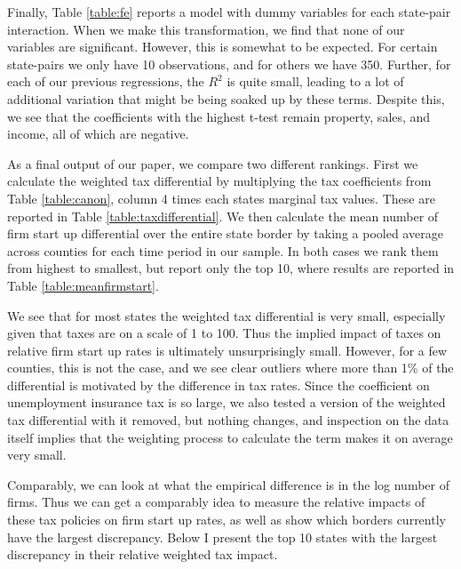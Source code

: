 Finally, Table \ref{table:fe} reports a model with dummy variables for each state-pair interaction. When we make this transformation, we find that none of our variables are significant. However, this is somewhat to be expected. For certain state-pairs we only have 10 observations, and for others we have 350. Further, for each of our previous regressions, the $R^{2}$ is quite small, leading to a lot of additional variation that might be being soaked up by these terms. Despite this, we see that the coefficients with the highest t-test remain property, sales, and income, all of which are negative.

As a final output of our paper, we compare two different rankings. First we calculate the weighted tax differential by multiplying the tax coefficients from Table \ref{table:canon}, column 4 times each states marginal tax values. These are reported in Table \ref{table:taxdifferential}. We then calculate the mean number of firm start up differential over the entire state border by taking a pooled average across counties for each time period in our sample. In both cases we rank them from highest to smallest, but report only the top 10, where results are reported in Table \ref{table:meanfirmstart}.

We see that for most states the weighted tax differential is very small, especially given that taxes are on a scale of 1 to 100. Thus the implied impact of taxes on relative firm start up rates is ultimately unsurprisingly small. However, for a few counties, this is not the case, and we see clear outliers where more than 1\% of the differential is motivated by the difference in tax rates. Since the coefficient on unemployment insurance tax is so large, we also tested a version of the weighted tax differential with it removed, but nothing changes, and inspection on the data itself implies that the weighting process to calculate the term makes it on average very small.

Comparably, we can look at what the empirical difference is in the log number of firms. Thus we can get a comparably idea to measure the relative impacts of these tax policies on firm start up rates, as well as show which borders currently have the largest discrepancy. Below I present the top 10 states with the largest discrepancy in their relative weighted tax impact.
